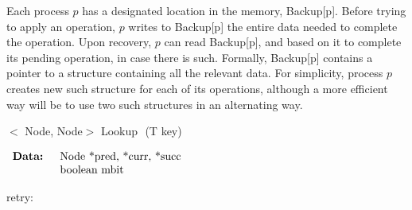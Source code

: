 Each process $p$ has a designated location in the memory, Backup[p]. Before trying to apply an operation, $p$ writes to Backup[p] the entire data needed to complete the operation. Upon recovery, $p$ can read Backup[p], and based on it to complete its pending operation, in case there is such. Formally, Backup[p] contains a pointer to a structure containing all the relevant data.
For simplicity, process $p$ creates new such structure for each of its operations, although a more efficient way will be to use two such structures in an alternating way. 


\begin{procedure}[b]
	\footnotesize
	
	\caption{$<$ Node, Node$>$ Lookup $ $ (T key)}
	
	$ \begin{array}{rl}
	\mbox{\textbf{Data: }}	&	\mbox{Node *pred, *curr, *succ} \\
							&	\mbox{boolean mbit}
	\end{array} $
	
	
	retry: 
	
\end{procedure}

